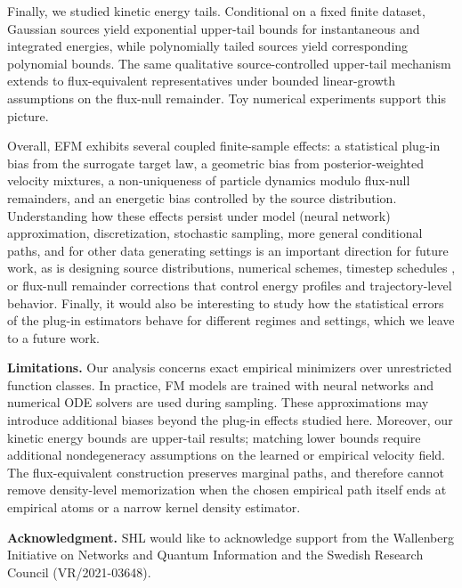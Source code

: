 \documentclass[a4paper,11pt]{article}
\theoremstyle{plain}
\theoremstyle{definition}
\begin{document}
Finally, we studied kinetic energy tails. Conditional on a fixed finite dataset, Gaussian sources yield exponential upper-tail bounds for instantaneous and integrated energies, while polynomially tailed sources yield corresponding polynomial bounds. The same qualitative source-controlled upper-tail mechanism extends to flux-equivalent representatives under bounded linear-growth assumptions on the flux-null remainder. Toy numerical experiments support this picture.

Overall, EFM exhibits several coupled finite-sample effects: a statistical plug-in bias from the surrogate target law, a geometric bias from posterior-weighted velocity mixtures, a non-uniqueness of particle dynamics modulo flux-null remainders, and an energetic bias controlled by the source distribution. Understanding how these effects persist under model (neural network) approximation, discretization, stochastic sampling, more general conditional paths, and for other data generating settings \cite{lim2024elucidating, lim2026flow} is an important direction for future work, as is designing source distributions, numerical schemes, timestep schedules \cite{gupta2026sharpenflowsharpnessawaresampling}, or flux-null remainder corrections that control energy profiles and trajectory-level behavior. Finally, it would also be interesting to study how the statistical errors of the plug-in estimators behave for different regimes and settings, which we leave to a future work.

{\bf Limitations.} Our analysis concerns exact empirical minimizers over unrestricted function classes. In practice, FM models are trained with neural networks and numerical ODE solvers are used during sampling. These approximations may introduce additional biases beyond the plug-in effects studied here. Moreover, our kinetic energy bounds are upper-tail results; matching lower bounds require additional nondegeneracy assumptions on the learned or empirical velocity field. The flux-equivalent construction preserves marginal paths, and therefore cannot remove density-level memorization when the chosen empirical path itself ends at empirical atoms or a narrow kernel density estimator. %

{\bf Acknowledgment.} SHL would like to acknowledge support from the Wallenberg Initiative on Networks and Quantum Information   and the Swedish Research Council (VR/2021-03648).
\end{document}
